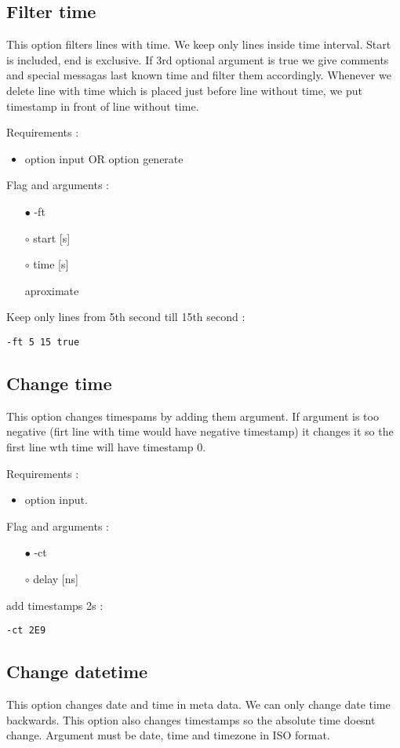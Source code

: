 \documentclass[english]{article}
\begin{document}
\subsection{Filter time}
This option filters lines with time. We keep only lines inside time interval. Start is included, end is exclusive. If 3rd optional argument is true we give comments and special messagas last known time and filter them accordingly.  Whenever we delete line with time which is placed just before line without time, we put timestamp in front of line without time.

\noindent Requirements : 
\begin{itemize}
\item option input OR option generate
\end{itemize}
Flag and arguments :
\begin{itemize}
\item[$\bullet$] -ft
\item[$\circ$] start [s]
\item[$\circ$] time [s]
\item[\textasteriskcentered] aproximate
\end{itemize}
Keep only lines from 5th second till 15th second : 
\begin{lstlisting} 
-ft 5 15 true
\end{lstlisting}


\subsection{Change time}
This option changes timespams by adding them argument. If argument is too negative (firt line with time would have negative timestamp) it changes it so the first line wth time will have timestamp 0. 

\noindent Requirements : 
\begin{itemize}
\item option input. 
\end{itemize}
Flag and arguments :
\begin{itemize}
\item[$\bullet$] -ct
\item[$\circ$] delay [ns]
\end{itemize}
add timestamps 2s : 
\begin{lstlisting} 
-ct 2E9
\end{lstlisting}


\subsection{Change datetime}
This option changes date and time in meta data. We can only change date time backwards. This option also changes timestamps so the absolute time doesnt change. Argument must be date, time and timezone in ISO format. 
\end{document}
